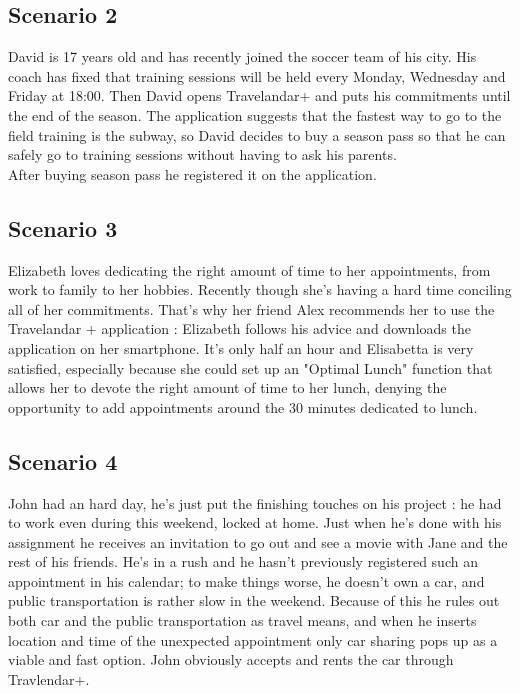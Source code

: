 \subsection{Scenario 2}

David is 17 years old and has recently joined the soccer team of his city. His coach has fixed that training sessions will be held every Monday, Wednesday and Friday at 18:00. Then David opens Travelandar+ and puts his commitments until the end of the season. The application suggests that the fastest way to go to the field training is the subway, so David decides to buy a season pass so that he can safely go to training sessions without having to ask his parents.\\
After buying season pass he registered it on the application.


\subsection{Scenario 3}

Elizabeth loves dedicating the right amount of time to her appointments, from work to family to her hobbies. Recently though she’s having a hard time conciling all of her commitments. 
That’s why her friend Alex recommends her to use the Travelandar + application : Elizabeth follows his advice and downloads the application on her smartphone. 
It’s only half an hour and Elisabetta is very satisfied, especially because she could set up an "Optimal Lunch" function that allows her to devote the right amount of time to her lunch, denying the opportunity to add appointments around the 30 minutes dedicated to lunch.

\subsection {Scenario 4}
John had an hard day, he’s just put the finishing touches on his project : he had to work even during this weekend, locked at home. Just when he’s done with his assignment he receives an invitation to go out and see a movie with Jane and the rest of his friends. 
He’s in a rush and he hasn’t previously registered such an appointment in his calendar; to make things worse, he doesn’t own a car, and public transportation is rather slow in the weekend. Because of this he rules out both car and the public transportation as travel means, and when he inserts location and time of the unexpected appointment only car sharing pops up as a viable and fast option. 
John obviously accepts and rents the car through Travlendar+. 

